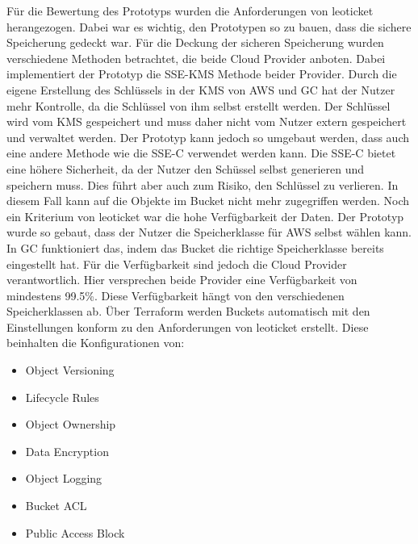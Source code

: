 Für die Bewertung des Prototyps wurden die Anforderungen von leoticket herangezogen. Dabei war es wichtig, den Prototypen so zu bauen, dass die sichere Speicherung gedeckt war. Für die Deckung der sicheren Speicherung wurden verschiedene Methoden betrachtet, die beide Cloud Provider anboten. Dabei implementiert der Prototyp die SSE-KMS Methode beider Provider. Durch die eigene Erstellung des Schlüssels in der KMS von AWS und GC hat der Nutzer mehr Kontrolle, da die Schlüssel von ihm selbst erstellt werden. Der Schlüssel wird vom KMS gespeichert und muss daher nicht vom Nutzer extern gespeichert und verwaltet werden. Der Prototyp kann jedoch so umgebaut werden, dass auch eine andere Methode wie die SSE-C verwendet werden kann. Die SSE-C bietet eine höhere Sicherheit, da der Nutzer den Schüssel selbst generieren und speichern muss. Dies führt aber auch zum Risiko, den Schlüssel zu verlieren. In diesem Fall kann auf die Objekte im Bucket nicht mehr zugegriffen werden. Noch ein Kriterium von leoticket war die hohe Verfügbarkeit der Daten. Der Prototyp wurde so gebaut, dass der Nutzer die Speicherklasse für AWS selbst wählen kann. In GC funktioniert das, indem das Bucket die richtige Speicherklasse bereits eingestellt hat. Für die Verfügbarkeit sind jedoch die Cloud Provider verantwortlich. Hier versprechen beide Provider eine Verfügbarkeit von mindestens 99.5\%. Diese Verfügbarkeit hängt von den verschiedenen Speicherklassen ab. Über Terraform werden Buckets automatisch mit den Einstellungen konform zu den Anforderungen von leoticket erstellt. Diese beinhalten die Konfigurationen von:

\begin{itemize}
	\item Object Versioning
	\item Lifecycle Rules
	\item Object Ownership
	\item Data Encryption
	\item Object Logging
	\item Bucket ACL
	\item Public Access Block
\end{itemize}


